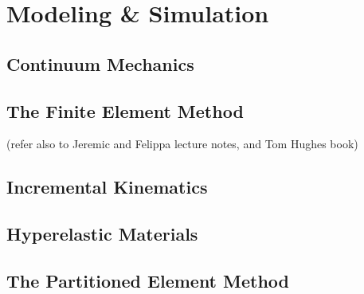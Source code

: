 \chapter{Modeling \& Simulation}
%


\section{Continuum Mechanics}
\label{Continuum Mechanics}
\section{The Finite Element Method}
\label{The Finite Element Method}
(refer also to Jeremic and Felippa lecture notes, and Tom Hughes book)
\section{Incremental Kinematics}
\label{Incremental Kinematics}
\section{Hyperelastic Materials}
\label{Hyperelastic Materials}
\section{The Partitioned Element Method}
\label{The Partitioned Element Method}
